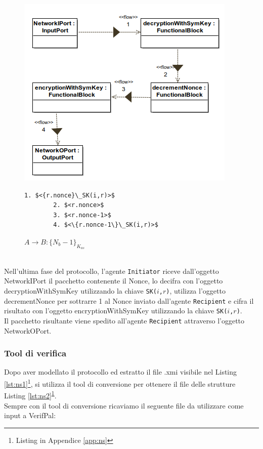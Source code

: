 \begin{figure}[h!] 
    \centering 
    \includegraphics[scale=0.6]{../img/NSSK/ThirdMessage.png} 
    \begin{lstlisting}[frame=single, mathescape, basicstyle=\footnotesize]
        1. $<{r.nonce}\_SK(i,r)>$
        2. $<r.nonce>$
        3. $<r.nonce-1>$
        4. $<\{r.nonce-1\}\_SK(i,r)>$
    \end{lstlisting}
    \caption{$A \rightarrow B : \{N_b-1\}_{K_{as}}$} 
\end{figure}\\
\noindent Nell'ultima fase del protocollo, l'agente \texttt{Initiator} riceve dall'oggetto NetworkIPort il pacchetto contenente il Nonce, lo decifra con l'oggetto decryptionWithSymKey utilizzando la chiave \texttt{SK($i$,$r$)}, utilizza l'oggetto decrementNonce per sottrarre 1 al Nonce inviato dall'agente \texttt{Recipient} e cifra il risultato con l'oggetto encryptionWithSymKey utilizzando la chiave \texttt{SK($i$,$r$)}.\\
Il pacchetto risultante viene spedito all'agente \texttt{Recipient} attraverso l'oggetto NetworkOPort.\\

\newpage
\subsubsection*{Tool di verifica}
Dopo aver modellato il protocollo ed estratto il file .xmi visibile nel Listing \ref{lst:ns1}\footnote{\label{note:a}Listing in Appendice \ref{app:ns}}, si utilizza il tool di conversione per ottenere il file delle strutture Listing \ref{lst:ns2}\textsuperscript{\ref{note:a}}.\\
Sempre con il tool di conversione ricaviamo il seguente file da utilizzare come input a VerifPal:

